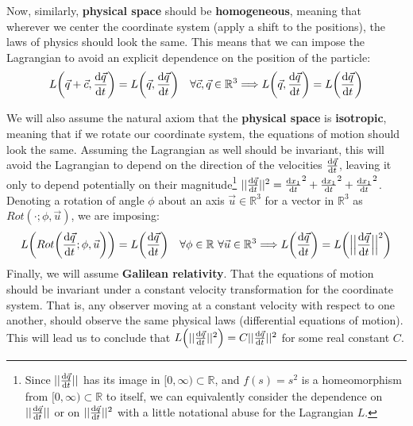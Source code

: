 \documentclass[11pt, a4paper]{article} %
\newcommand{\R}{\mathbb{R}} %
\begin{document}
Now, similarly, {\bf physical space} should be {\bf homogeneous}, meaning that wherever we center the coordinate system (apply a shift to the positions), the laws of physics should look the same. This means that we can impose the Lagrangian to avoid an explicit dependence on the position of the particle:
\begin{equation}
L\qty( \vec{q}+\vec{c}, \dv{\vec{q}}{t})=L\qty( \vec{q}, \dv{\vec{q}}{t})\quad \forall \vec{c},\vec{q}\in \R^3 \Longrightarrow L\qty( \vec{q}, \dv{\vec{q}}{t})=L\qty( \dv{\vec{q}}{t})
\end{equation}

We will also assume the natural axiom that the {\bf physical space} is {\bf isotropic}, meaning that if we rotate our coordinate system, the equations of motion should look the same. Assuming the Lagrangian as well should be invariant, this will avoid the Lagrangian to depend on the direction of the velocities $\dv{\vec{q}}{t}$, leaving it only to depend potentially on their magnitude\footnote{Since $||\dv{\vec{q}}{t}||$ has its image in $[0,\infty)\subset\R$, and $f(s)=s^2$ is a homeomorphism from $[0,\infty)\subset\R$ to itself, we can equivalently consider the dependence on $||\dv{\vec{q}}{t}||$ or on $||\dv{\vec{q}}{t}||^2$ with a little notational abuse for the Lagrangian $L$.} $||\dv{\vec{q}}{t}||^2=\dv{x_1}{t}^2+\dv{x_1}{t}^2+\dv{x_1}{t}^2$. Denoting a rotation of angle $\phi$ about an axis $\vec{u}\in\R^3$ for a vector in $\R^3$ as $Rot(\cdot;\phi, \vec{u})$, we are imposing:
\begin{equation}
L\qty( Rot\qty( \dv{\vec{q}}{t}; \phi, \vec{u} ))=L\qty( \dv{\vec{q}}{t})\quad \forall \phi\in\R\ \forall \vec{u}\in \R^3 \Longrightarrow L\qty(\dv{\vec{q}}{t})=L\qty( \Big|\Big|\dv{\vec{q}}{t}\Big|\Big|^2)
\end{equation}
Finally, we will assume {\bf Galilean relativity}. That the equations of motion should be invariant under a constant velocity transformation for the coordinate system. That is, any observer moving at a constant velocity with respect to one another, should observe the same physical laws (differential equations of motion). This will lead us to conclude that $L\qty( ||\dv{\vec{q}}{t}||^2)=C ||\dv{\vec{q}}{t}||^2$ for some real constant $C$.
\end{document}
